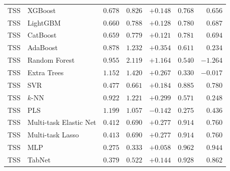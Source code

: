 \begin{longtable}{lp{3.1cm}rrrrr}
TSS & XGBoost & $0.678$ & $0.826$ & $+0.148$ & $0.768$ & $0.656$ \\
TSS & LightGBM & $0.660$ & $0.788$ & $+0.128$ & $0.780$ & $0.687$ \\
TSS & CatBoost & $0.659$ & $0.779$ & $+0.121$ & $0.781$ & $0.694$ \\
TSS & AdaBoost & $0.878$ & $1.232$ & $+0.354$ & $0.611$ & $0.234$ \\
TSS & Random Forest & $0.955$ & $2.119$ & $+1.164$ & $0.540$ & $-1.264$ \\
TSS & Extra Trees & $1.152$ & $1.420$ & $+0.267$ & $0.330$ & $-0.017$ \\
TSS & SVR & $0.477$ & $0.661$ & $+0.184$ & $0.885$ & $0.780$ \\
TSS & $k$-NN & $0.922$ & $1.221$ & $+0.299$ & $0.571$ & $0.248$ \\
TSS & PLS & $1.199$ & $1.057$ & $-0.142$ & $0.275$ & $0.436$ \\
TSS & Multi-task Elastic Net & $0.412$ & $0.690$ & $+0.277$ & $0.914$ & $0.760$ \\
TSS & Multi-task Lasso & $0.413$ & $0.690$ & $+0.277$ & $0.914$ & $0.760$ \\
TSS & MLP & $0.275$ & $0.333$ & $+0.058$ & $0.962$ & $0.944$ \\
TSS & TabNet & $0.379$ & $0.522$ & $+0.144$ & $0.928$ & $0.862$ \\
\end{longtable}
